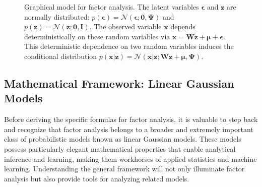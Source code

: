 \begin{figure}[ht]
\begin{center}
\caption{Graphical model for factor analysis. The latent variables $\boldsymbol{\epsilon}$ and $\mathbf{z}$ are normally distributed: $p(\boldsymbol{\epsilon})=\mathcal{N}(\boldsymbol{\epsilon};\mathbf{0}, \boldsymbol{\Psi})$ and $p(\mathbf{z})=\mathcal{N}(\mathbf{z};\mathbf{0}, \mathbf{I})$. The observed variable $\mathbf{x}$ depends deterministically on these random variables via $\mathbf{x}=\mathbf{W}\mathbf{z}+\boldsymbol{\mu}+\boldsymbol{\epsilon}$. This deterministic dependence on two random variables induces the conditional distribution $p(\mathbf{x}|\mathbf{z})=\mathcal{N}(\mathbf{x}|\mathbf{z};\mathbf{W}\mathbf{z}+\boldsymbol{\mu}, \boldsymbol{\Psi})$.
}\label{f:fa}
\end{center}
\end{figure}

\subsection*{Mathematical Framework: Linear Gaussian Models}

Before deriving the specific formulas for factor analysis, it is valuable to step back and recognize that factor analysis belongs to a broader and extremely important class of probabilistic models known as linear Gaussian models. These models possess particularly elegant mathematical properties that enable analytical inference and learning, making them workhorses of applied statistics and machine learning. Understanding the general framework will not only illuminate factor analysis but also provide tools for analyzing related models.

